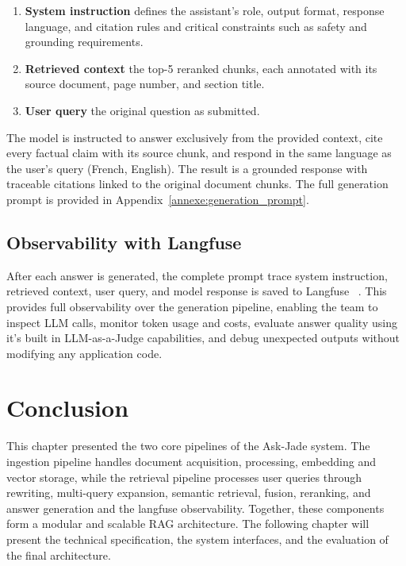 \begin{enumerate}
  \item \textbf{System instruction} defines the assistant's role, output
        format, response language, and citation rules and critical constraints such as safety and grounding requirements. 
  \item \textbf{Retrieved context} the top-5 reranked chunks, each
        annotated with its source document, page number, and section title.
  \item \textbf{User query} the original question as submitted.
\end{enumerate}

The model is instructed to answer exclusively from the provided context, cite
every factual claim with its source chunk, and respond in the same language as
the user's query (French, English). The result is a grounded
response with traceable citations linked to the original document chunks.
The full generation prompt is provided in Appendix~\ref{annexe:generation_prompt}.

\subsection{Observability with Langfuse}

After each answer is generated, the complete prompt trace system
instruction, retrieved context, user query, and model response is saved to
Langfuse ~\cite{langfuse}. This provides full observability over the
generation pipeline, enabling the team to inspect LLM calls, monitor token
usage and costs, evaluate answer quality using it's built in LLM-as-a-Judge capabilities, and debug unexpected outputs without
modifying any application code.



\section{Conclusion}
This chapter presented the two core pipelines of the Ask-Jade system.
The ingestion pipeline handles document acquisition, processing, embedding
and vector storage, while the retrieval pipeline processes user queries
through rewriting, multi-query expansion, semantic retrieval, fusion,
reranking, and answer generation and the langfuse observability. Together, these components form a
modular and scalable RAG architecture. The following chapter will present
the technical specification, the system interfaces, and the evaluation
of the final architecture.